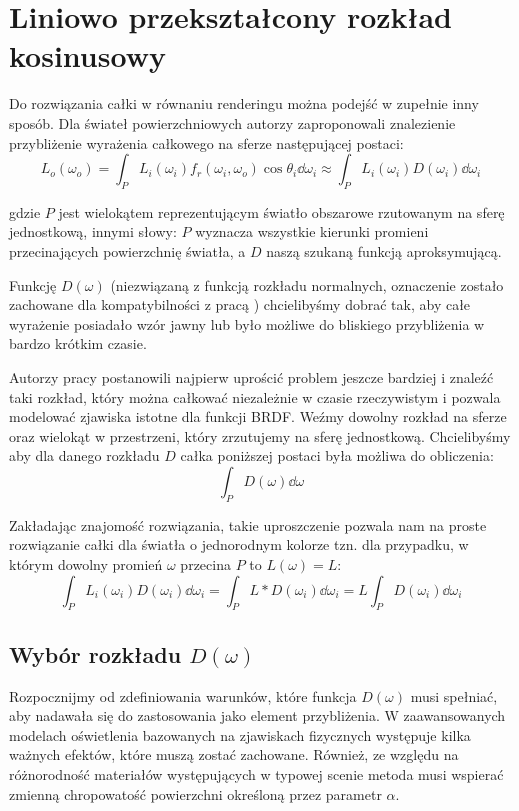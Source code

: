 \documentclass[../main.tex]{subfiles}
\begin{document}
\chapter{Liniowo przekształcony rozkład kosinusowy}
\label{Chapter:LTC}

Do rozwiązania całki w równaniu renderingu można podejść w zupełnie inny sposób. Dla świateł powierzchniowych autorzy \cite{ltc_heitz} zaproponowali znalezienie przybliżenie wyrażenia całkowego na sferze następującej postaci:
\[
L_o(\omega_o) = \int_{P} {
  L_i(\omega_i)
  f_r(\omega_i, \omega_o)
  \cos \theta_i
  \dd \omega_i
}
\approx
\int_{P} {
  L_i(\omega_i)
  D(\omega_i)
  \dd \omega_i
}
\]

\noindent gdzie $P$ jest wielokątem reprezentującym światło obszarowe rzutowanym na sferę jednostkową, innymi słowy: $P$ wyznacza wszystkie kierunki promieni przecinających powierzchnię światła, a $D$ naszą szukaną funkcją aproksymującą.

Funkcję $D(\omega)$ (niezwiązaną z funkcją rozkładu normalnych, oznaczenie zostało zachowane dla kompatybilności z pracą \cite{ltc_heitz}) chcielibyśmy dobrać tak, aby całe wyrażenie posiadało wzór jawny lub było możliwe do bliskiego przybliżenia w bardzo krótkim czasie.

Autorzy pracy \cite{ltc_heitz} postanowili najpierw uprościć problem jeszcze bardziej i znaleźć taki rozkład, który można całkować niezależnie w czasie rzeczywistym i pozwala modelować  zjawiska istotne dla funkcji BRDF. Weźmy dowolny rozkład na sferze oraz wielokąt  w przestrzeni, który zrzutujemy na sferę jednostkową. Chcielibyśmy aby dla danego rozkładu $D$ całka poniższej postaci była możliwa do obliczenia:
\[
\int_P {
    D(\omega)
    \dd \omega
}
\]

Zakładając znajomość rozwiązania, takie uproszczenie pozwala nam na proste rozwiązanie całki dla światła o jednorodnym kolorze tzn. dla przypadku, w którym dowolny promień $\omega$ przecina $P$ to $L(\omega)=L$:
\[
\int_{P} {
    L_i(\omega_i)
    D(\omega_i)
    \dd \omega_i
} = \int_{P} {
    L *
    D(\omega_i)
    \dd \omega_i
} = L \int_{P} {
    D(\omega_i)
    \dd \omega_i
}
\]

\section{Wybór rozkładu $D(\omega)$}

Rozpocznijmy od zdefiniowania warunków, które funkcja $D(\omega)$ musi spełniać, aby nadawała się do zastosowania jako element przybliżenia. W zaawansowanych modelach oświetlenia bazowanych na zjawiskach fizycznych występuje kilka ważnych efektów, które muszą zostać zachowane. Również, ze względu na różnorodność materiałów występujących w typowej scenie metoda musi wspierać zmienną chropowatość powierzchni określoną przez parametr $\alpha$.
\end{document}
